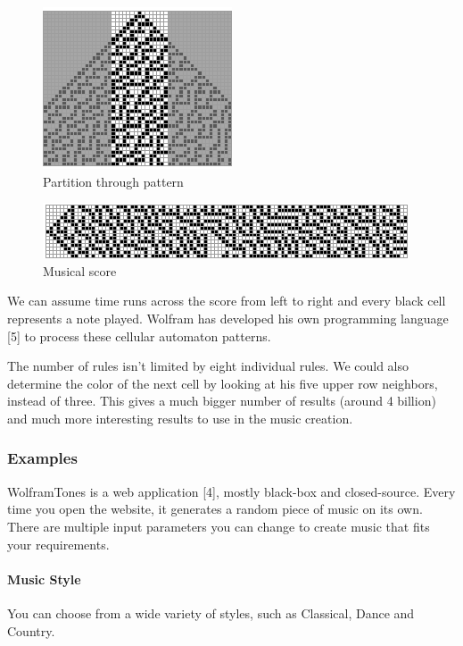 \documentclass[12pt]{article}
\begin{document}
 \begin{figure}[h]
\centering
\includegraphics[]{img/wolframMusic1}
\caption{Partition through pattern}
\end{figure}

\begin{figure}[h]
\centering
\includegraphics[]{img/wolframMusic2}
\caption{Musical score}
\end{figure}

We can assume time runs across the score from left to right and every black cell represents a note played. Wolfram has developed his own programming language [5] to process these cellular automaton patterns.
\newline

The number of rules isn't limited by eight individual rules. We could also determine the color of the next cell by looking at his five upper row neighbors, instead of three. This gives a much bigger number of results (around 4 billion) and much more interesting results to use in the music creation. 

\subsubsection{Examples}

WolframTones is a web application [4], mostly black-box and closed-source. Every time you open the website, it generates a random piece of music on its own. There are multiple input parameters you can change to create music that fits your requirements. 

\paragraph{Music Style} You can choose from a wide variety of styles, such as Classical, Dance and Country.
\end{document}
